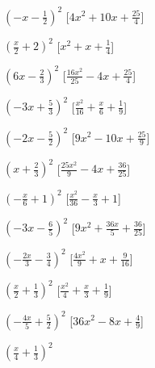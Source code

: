 \begin{esercizio}
\begin{multicols}{2}
\begin{enumeratea}
\item \(\left(- x - \frac{1}{2}\right)^{2}\)
  \hfill [\(4 x^{2} + 10 x + \frac{25}{4}\)]
\item \(\left(\frac{x}{2} + 2\right)^{2}\)
  \hfill [\(x^{2} + x + \frac{1}{4}\)]
\item \(\left(6 x - \frac{2}{3}\right)^{2}\)
  \hfill [\(\frac{16 x^{2}}{25} - 4 x + \frac{25}{4}\)]
\item \(\left(- 3 x + \frac{5}{3}\right)^{2}\)
  \hfill [\(\frac{x^{2}}{16} + \frac{x}{6} + \frac{1}{9}\)]
\item \(\left(- 2 x - \frac{5}{2}\right)^{2}\)
  \hfill [\(9 x^{2} - 10 x + \frac{25}{9}\)]
\item \(\left(x + \frac{2}{3}\right)^{2}\)
  \hfill [\(\frac{25 x^{2}}{9} - 4 x + \frac{36}{25}\)]
\item \(\left(- \frac{x}{6} + 1\right)^{2}\)
  \hfill [\(\frac{x^{2}}{36} - \frac{x}{3} + 1\)]
\item \(\left(- 3 x - \frac{6}{5}\right)^{2}\)
  \hfill [\(9 x^{2} + \frac{36 x}{5} + \frac{36}{25}\)]
\item \(\left(- \frac{2 x}{3} - \frac{3}{4}\right)^{2}\)
  \hfill [\(\frac{4 x^{2}}{9} + x + \frac{9}{16}\)]
\item \(\left(\frac{x}{2} + \frac{1}{3}\right)^{2}\)
  \hfill [\(\frac{x^{2}}{4} + \frac{x}{3} + \frac{1}{9}\)]
\item \(\left(- \frac{4 x}{5} + \frac{5}{2}\right)^{2}\)
  \hfill [\(36 x^{2} - 8 x + \frac{4}{9}\)]
\item \(\left(\frac{x}{4} + \frac{1}{3}\right)^{2}\)

\end{enumeratea}
\end{multicols}
\end{esercizio}
